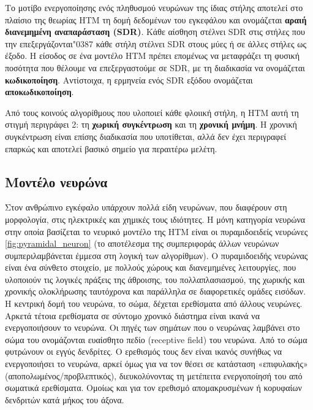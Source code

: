 	Το μοτίβο ενεργοποίησης ενός πληθυσμού νευρώνων της ίδιας στήλης αποτελεί στο πλαίσιο της θεωρίας HTM τη δομή δεδομένων του εγκεφάλου
	και ονομάζεται \textbf{αραιή διανεμημένη αναπαράσταση (SDR)}.
	Κάθε αίσθηση στέλνει SDR στις στήλες που την επεξεργάζονται\char"0387  κάθε στήλη στέλνει SDR στους μύες ή σε άλλες στήλες ως έξοδο.
	Η είσοδος σε ένα μοντέλο HTM πρέπει επομένως να μεταφράζει τη φυσική ποσότητα που θέλουμε να επεξεργαστούμε σε SDR, με τη διαδικασία να ονομάζεται \textbf{κωδικοποίηση}.
	Αντίστοιχα, η ερμηνεία ενός SDR εξόδου ονομάζεται \textbf{αποκωδικοποίηση}.

	Από τους κοινούς αλγορίθμους που υλοποιεί κάθε φλοιική στήλη, η HTM αυτή τη στιγμή περιγράφει 2: τη \textbf{χωρική συγκέντρωση} και τη \textbf{χρονική μνήμη}.
	Η χρονική συγκέντρωση είναι επίσης διαδικασία που υποτίθεται, αλλά δεν έχει περιγραφεί επαρκώς και αποτελεί βασικό σημείο για περαιτέρω μελέτη.


\subsection{Μοντέλο νευρώνα} \label{sec:model_neuron}

	Στον ανθρώπινο εγκέφαλο υπάρχουν πολλά είδη νευρώνων, που διαφέρουν στη μορφολογία, στις ηλεκτρικές και χημικές τους ιδιότητες.
	Η μόνη κατηγορία νευρώνα στην οποία βασίζεται το νευρικό μοντέλο της HTM είναι οι πυραμιδοειδείς νευρώνες \ref{fig:pyramidal_neuron}
	(το αποτέλεσμα της συμπεριφοράς άλλων νευρώνων συμπεριλαμβάνεται έμμεσα στη λογική των αλγορίθμων).
	Ο πυραμιδοειδής νευρώνας είναι ένα σύνθετο στοιχείο, με πολλούς χώρους και διανεμημένες λειτουργίες, που υλοποιούν τις λογικές πράξεις της άθροισης,
	του πολλαπλασιασμού, της χωρικής και χρονικής ολοκλήρωσης ταυτόχρονα και παράλληλα σε διαφορετικές ομάδες εισόδων.
	Η κεντρική δομή του νευρώνα, το σώμα, δέχεται ερεθίσματα από άλλους νευρώνες.
	Αρκετά τέτοια ερεθίσματα σε σύντομο χρονικό διάστημα είναι ικανά να ενεργοποιήσουν το νευρώνα.
	Οι πηγές των σημάτων που ο νευρώνας λαμβάνει στο σώμα του ονομάζονται ευαίσθητο πεδίο (receptive field) του νευρώνα.
	Από το σώμα φυτρώνουν οι εγγύς δενδρίτες. Ο ερεθισμός τους δεν είναι ικανός συνήθως να ενεργοποιήσει το νευρώνα, αρκεί όμως για να τον θέσει
	σε κατάσταση «επιφυλακής» (αποπολωμένος/προβλεπτικός), διευκολύνοντας τη μετέπειτα ενεργοποίησή του από σωματικά ερεθίσματα.
	Ομοίως και για τον ερεθισμό απομακρυσμένων ή κορυφαίων δενδριτών κατά μήκος του άξονα.

